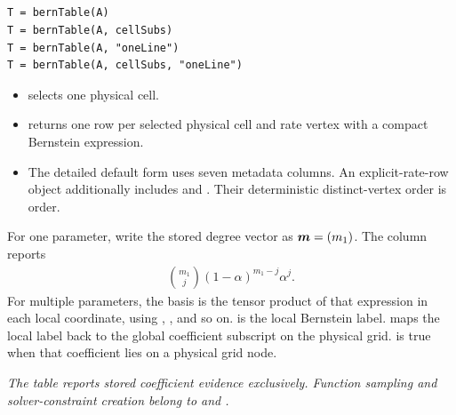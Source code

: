\subsection{\texorpdfstring{}{bernTable}}
\label{sec:pdmat-table}

\syntaxhead
\begin{lstlisting}[style=dpsyntax]
T = bernTable(A)
T = bernTable(A, cellSubs)
T = bernTable(A, "oneLine")
T = bernTable(A, cellSubs, "oneLine")
\end{lstlisting}

\arghead
\begin{itemize}[leftmargin=*]
  \item {} selects one physical cell. \item {} returns one row per selected physical cell and rate vertex with a compact Bernstein expression. \item The detailed default form uses seven metadata columns. An explicit-rate-row object additionally includes  and . Their deterministic distinct-vertex order is  order.
\end{itemize}

For one parameter, write the stored degree vector as $\boldsymbol{m}=(m_1)$. The  column reports
\begin{gather*}
  \binom{m_1}{j}(1-\alpha)^{m_1-j}\alpha^j.
\end{gather*}
For multiple parameters, the basis is the tensor product of that expression in each local coordinate, using , , and so on.  is the local Bernstein label.  maps the local label back to the global coefficient subscript on the physical grid.   is true when that coefficient lies on a physical grid node.

\begin{center}

\textit{The table reports stored coefficient evidence exclusively. Function sampling and solver-constraint creation belong to  and .}
\end{center}

